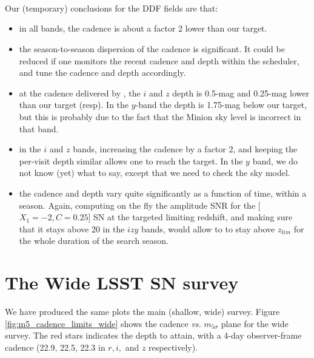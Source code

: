 \documentclass[\docopts]{\docclass}
\begin{document}
\paragraph{~} Our (temporary) conclusions for the DDF fields are that:
\begin{itemize}
\item in all bands, the cadence is about a factor 2 lower than our target.
\item the season-to-season dispersion of the cadence is
  significant. It could be reduced if one monitors the recent cadence
  and depth within the scheduler, and tune the cadence and depth
  accordingly.
\item at the cadence delivered by , the $i$ and $z$ depth
  is 0.5-mag and 0.25-mag lower than our target (resp). In the
  $y$-band the depth is 1.75-mag below our target, but this is
  probably due to the fact that the Minion sky level is incorrect in that band.
\item in the $i$ and $z$ bands, increasing the cadence by a factor 2,
  and keeping the per-visit depth similar allows one to reach the
  target. In the $y$ band, we do not know (yet) what to say, except
  that we need to check the sky model.
\item the cadence and depth vary quite significantly as a function of
  time, within a season. Again, computing on the fly the amplitude SNR
  for the [$X_1=-2, C=0.25$] SN at the targeted limiting redshift, and
  making sure that it stays above 20 in the $izy$ bands, would allow
  to to stay above $z_{lim}$ for the whole duration of the search
  season.
\end{itemize}



\section{The Wide LSST SN survey}
\label{sec:wide_cadence}




We have produced the same plots the main (shallow, wide)
survey. Figure \ref{fig:m5_cadence_limits_wide} shows the cadence {\em
  vs.}  $m_{5\sigma}$ plane for the wide survey.  The red stars
indicates the depth to attain, with a 4-day observer-frame cadence
(22.9, 22.5, 22.3 in $r, i, $ and $z$ respectively).
\end{document}
